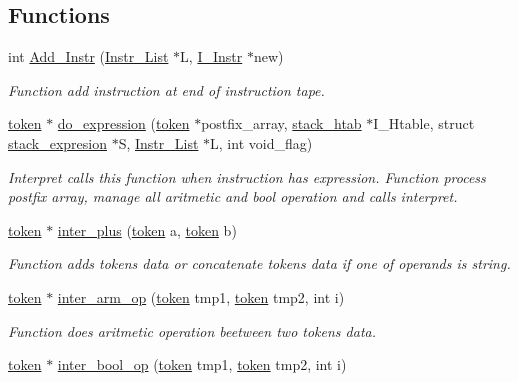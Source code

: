 \subsection*{Functions}
\begin{DoxyCompactItemize}
\item 
int \hyperlink{group__interpret__processing_gadade5a9b656f2be2400ad5077f5eb2b8}{Add\+\_\+\+Instr} (\hyperlink{structInstr__List}{Instr\+\_\+\+List} $\ast$L, \hyperlink{structI__Instr}{I\+\_\+\+Instr} $\ast$new)
\begin{DoxyCompactList}\small\item\em Function add instruction at end of instruction tape. \end{DoxyCompactList}\item 
\hyperlink{structtoken}{token} $\ast$ \hyperlink{group__interpret__processing_gadcc3f1cf66a07231171cb3f9daf62f16}{do\+\_\+expression} (\hyperlink{structtoken}{token} $\ast$postfix\+\_\+array, \hyperlink{structstack__htab}{stack\+\_\+htab} $\ast$I\+\_\+\+Htable, struct \hyperlink{structstack__expresion}{stack\+\_\+expresion} $\ast$S, \hyperlink{structInstr__List}{Instr\+\_\+\+List} $\ast$L, int void\+\_\+flag)
\begin{DoxyCompactList}\small\item\em Interpret calls this function when instruction has expression. Function process postfix array, manage all aritmetic and bool operation and calls interpret. \end{DoxyCompactList}\item 
\hyperlink{structtoken}{token} $\ast$ \hyperlink{group__interpret__processing_ga233bf069b8c22da3c02972ab1f239f08}{inter\+\_\+plus} (\hyperlink{structtoken}{token} a, \hyperlink{structtoken}{token} b)
\begin{DoxyCompactList}\small\item\em Function adds tokens data or concatenate tokens data if one of operands is string. \end{DoxyCompactList}\item 
\hyperlink{structtoken}{token} $\ast$ \hyperlink{group__interpret__processing_ga7b340f15ae1fe3489a2039e861ce7c1c}{inter\+\_\+arm\+\_\+op} (\hyperlink{structtoken}{token} tmp1, \hyperlink{structtoken}{token} tmp2, int i)
\begin{DoxyCompactList}\small\item\em Function does aritmetic operation beetween two tokens data. \end{DoxyCompactList}\item 
\hyperlink{structtoken}{token} $\ast$ \hyperlink{group__interpret__processing_ga661009ab992da6605dcd89536330eaf2}{inter\+\_\+bool\+\_\+op} (\hyperlink{structtoken}{token} tmp1, \hyperlink{structtoken}{token} tmp2, int i)

\end{DoxyCompactItemize}
